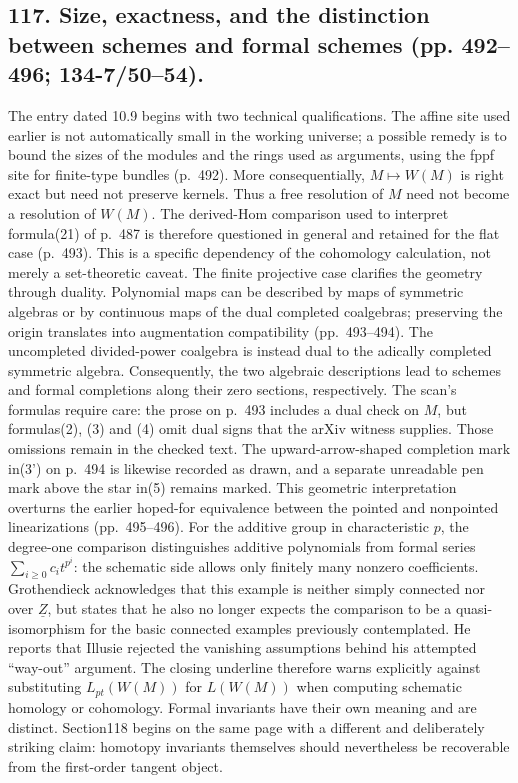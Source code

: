 \documentclass[10pt,oneside]{book}
\begin{document}
\subsection*{117. Size, exactness, and the distinction between schemes and formal schemes (pp. 492--496; 134-7/50--54).}
The entry dated 10.9 begins with two technical qualifications. The affine site used earlier is not automatically small in the working universe; a possible remedy is to bound the sizes of the modules and the rings used as arguments, using the fppf site for finite-type bundles (p.~492). More consequentially, $M\mapsto W(M)$ is right exact but need not preserve kernels. Thus a free resolution of $M$ need not become a resolution of $W(M)$. The derived-Hom comparison used to interpret formula(21) of p.~487 is therefore questioned in general and retained for the flat case (p.~493). This is a specific dependency of the cohomology calculation, not merely a set-theoretic caveat. The finite projective case clarifies the geometry through duality. Polynomial maps can be described by maps of symmetric algebras or by continuous maps of the dual completed coalgebras; preserving the origin translates into augmentation compatibility (pp.~493--494). The uncompleted divided-power coalgebra is instead dual to the adically completed symmetric algebra. Consequently, the two algebraic descriptions lead to schemes and formal completions along their zero sections, respectively. The scan's formulas require care: the prose on p.~493 includes a dual check on $M$, but formulas(2), (3) and (4) omit dual signs that the arXiv witness supplies. Those omissions remain in the checked text. The upward-arrow-shaped completion mark in(3') on p.~494 is likewise recorded as drawn, and a separate unreadable pen mark above the star in(5) remains marked. This geometric interpretation overturns the earlier hoped-for equivalence between the pointed and nonpointed linearizations (pp.~495--496). For the additive group in characteristic $p$, the degree-one comparison distinguishes additive polynomials from formal series $\sum_{i\geq0}c_i t^{p^i}$: the schematic side allows only finitely many nonzero coefficients. Grothendieck acknowledges that this example is neither simply connected nor over $\underline Z$, but states that he also no longer expects the comparison to be a quasi-isomorphism for the basic connected examples previously contemplated. He reports that Illusie rejected the vanishing assumptions behind his attempted ``way-out'' argument. The closing underline therefore warns explicitly against substituting $L_{pt}(W(M))$ for $L(W(M))$ when computing schematic homology or cohomology. Formal invariants have their own meaning and are distinct. Section118 begins on the same page with a different and deliberately striking claim: homotopy invariants themselves should nevertheless be recoverable from the first-order tangent object.
\end{document}
